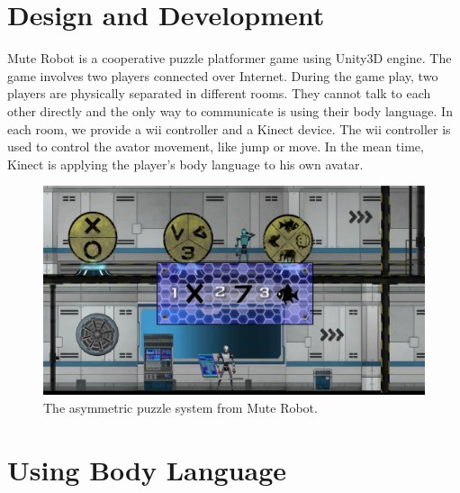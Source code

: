 \documentclass{chi-ext}
\begin{document}
 
  
\section{Design and Development}
Mute Robot is a cooperative puzzle platformer game using Unity3D\cite{Unity3D} engine. The game involves two players connected over Internet. During the game play, two players are physically separated in different rooms. 
They cannot talk to each other directly and the only way to communicate is using their body language. 
In each room, we provide a wii\cite{Wii} controller and a Kinect\cite{Kinect} device. 
The wii controller is used to control the avator movement, like jump or move. 
In the mean time, Kinect is applying the player's body language to his own avatar. 


\begin{figure}
  \centering
  \includegraphics[width=\linewidth]{figures/Figure1.jpg}
  \caption{The asymmetric puzzle system from Mute Robot.}
  \label{fig:Figure1}
\end{figure}


\section{Using Body Language}
\end{document}
